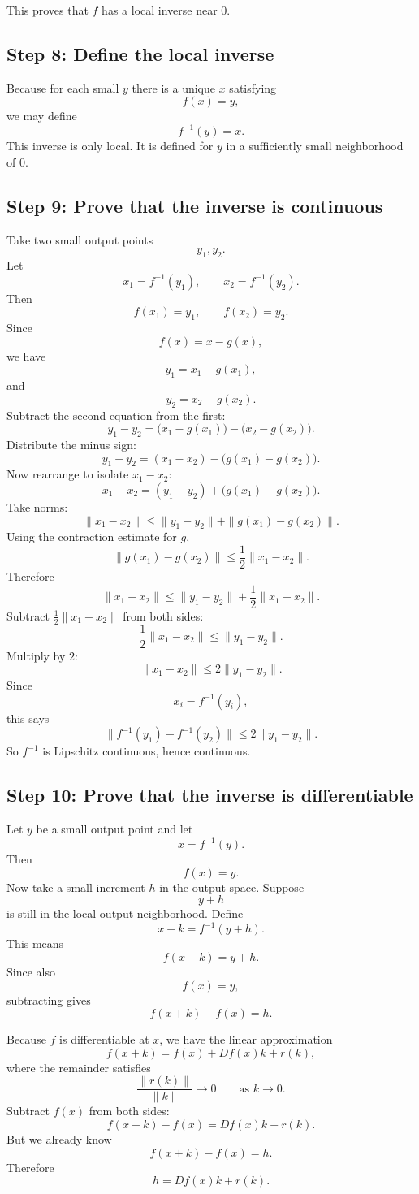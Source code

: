 \documentclass[11pt]{article}
\begin{document}
This proves that $f$ has a local inverse near $0$.

\subsection*{Step 8: Define the local inverse}

Because for each small $y$ there is a unique $x$ satisfying
\[
f(x)=y,
\]
we may define
\[
f^{-1}(y)=x.
\]
This inverse is only local. It is defined for $y$ in a sufficiently small neighborhood of $0$.

\subsection*{Step 9: Prove that the inverse is continuous}

Take two small output points
\[
y_1,y_2.
\]
Let
\[
x_1=f^{-1}(y_1),
\qquad
x_2=f^{-1}(y_2).
\]
Then
\[
f(x_1)=y_1,
\qquad
f(x_2)=y_2.
\]
Since
\[
f(x)=x-g(x),
\]
we have
\[
y_1=x_1-g(x_1),
\]
and
\[
y_2=x_2-g(x_2).
\]
Subtract the second equation from the first:
\[
y_1-y_2
=
\bigl(x_1-g(x_1)\bigr)-\bigl(x_2-g(x_2)\bigr).
\]
Distribute the minus sign:
\[
y_1-y_2
=
(x_1-x_2)-\bigl(g(x_1)-g(x_2)\bigr).
\]
Now rearrange to isolate $x_1-x_2$:
\[
x_1-x_2
=
(y_1-y_2)+\bigl(g(x_1)-g(x_2)\bigr).
\]
Take norms:
\[
\|x_1-x_2\|
\le
\|y_1-y_2\|+
\|g(x_1)-g(x_2)\|.
\]
Using the contraction estimate for $g$,
\[
\|g(x_1)-g(x_2)\|
\le
\frac12\|x_1-x_2\|.
\]
Therefore
\[
\|x_1-x_2\|
\le
\|y_1-y_2\|+\frac12\|x_1-x_2\|.
\]
Subtract $\frac12\|x_1-x_2\|$ from both sides:
\[
\frac12\|x_1-x_2\|
\le
\|y_1-y_2\|.
\]
Multiply by $2$:
\[
\|x_1-x_2\|
\le
2\|y_1-y_2\|.
\]
Since
\[
x_i=f^{-1}(y_i),
\]
this says
\[
\|f^{-1}(y_1)-f^{-1}(y_2)\|
\le
2\|y_1-y_2\|.
\]
So $f^{-1}$ is Lipschitz continuous, hence continuous.

\subsection*{Step 10: Prove that the inverse is differentiable}

Let $y$ be a small output point and let
\[
x=f^{-1}(y).
\]
Then
\[
f(x)=y.
\]
Now take a small increment $h$ in the output space. Suppose
\[
y+h
\]
is still in the local output neighborhood. Define
\[
x+k=f^{-1}(y+h).
\]
This means
\[
f(x+k)=y+h.
\]
Since also
\[
f(x)=y,
\]
subtracting gives
\[
f(x+k)-f(x)=h.
\]

Because $f$ is differentiable at $x$, we have the linear approximation
\[
f(x+k)=f(x)+Df(x)k+r(k),
\]
where the remainder satisfies
\[
\frac{\|r(k)\|}{\|k\|}\to 0
\qquad \text{as } k\to 0.
\]
Subtract $f(x)$ from both sides:
\[
f(x+k)-f(x)=Df(x)k+r(k).
\]
But we already know
\[
f(x+k)-f(x)=h.
\]
Therefore
\[
h=Df(x)k+r(k).
\]
\end{document}
